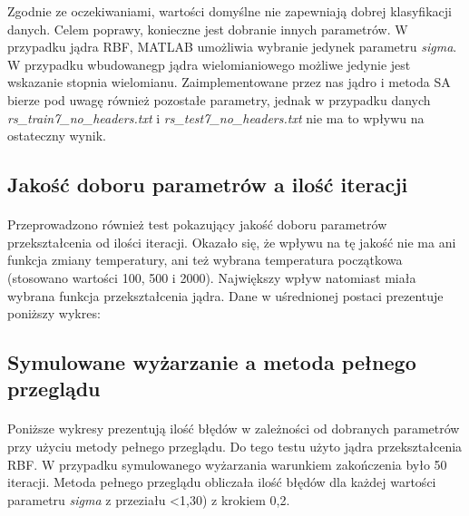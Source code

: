 \documentclass{article}
\begin{document}
Zgodnie ze oczekiwaniami, wartości domyślne nie zapewniają dobrej klasyfikacji danych. Celem poprawy, konieczne jest dobranie innych parametrów. W przypadku jądra RBF, MATLAB umożliwia wybranie jedynek parametru \textit{sigma}. W przypadku wbudowanegp jądra wielomianiowego możliwe jedynie jest wskazanie stopnia wielomianu. Zaimplementowane przez nas jądro i metoda SA bierze pod uwagę również pozostałe parametry, jednak w przypadku danych \textit{rs\_train7\_no\_headers.txt} i \textit{rs\_test7\_no\_headers.txt} nie ma to wpływu na ostateczny wynik.

\subsection{Jakość doboru parametrów a ilość iteracji}
\paragraph{}
Przeprowadzono również test pokazujący jakość doboru parametrów przekształcenia od ilości iteracji. Okazało się, że wpływu na tę jakość nie ma ani funkcja zmiany temperatury, ani też wybrana temperatura początkowa (stosowano wartości 100, 500 i 2000). Największy wpływ natomiast miała wybrana funkcja przekształcenia jądra. Dane w uśrednionej postaci prezentuje poniższy wykres:

\pgfplotsset{width=7cm,compat=1.4}
\begin{center}
\end{center}

\subsection{Symulowane wyżarzanie a metoda pełnego przeglądu}
\paragraph{}
Poniższe wykresy prezentują ilość błędów w zależności od dobranych parametrów przy użyciu metody pełnego  przeglądu. Do tego testu użyto jądra przekształcenia RBF. W przypadku symulowanego wyżarzania warunkiem zakończenia było 50 iteracji. Metoda pełnego przeglądu obliczała ilość błędów dla każdej wartości parametru \textit{sigma} z przeziału <1,30) z krokiem 0,2.
\end{document}
